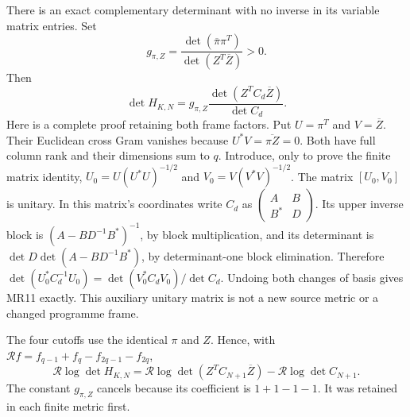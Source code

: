 \documentclass[11pt]{article}
\begin{document}
There is an exact complementary determinant with no inverse in its
variable matrix entries. Set
\[
 g_{\pi,Z}=
 \frac{\det(\overline\pi\pi^T)}{\det(Z^T\overline Z)}>0.
\]
Then
\[
 \boxed{\det H_{K,N}
     =g_{\pi,Z}\frac{\det(Z^TC_d\overline Z)}{\det C_d}.}
 \tag{MR11}
\]
Here is a complete proof retaining both frame factors. Put
$U=\pi^T$ and $V=\overline Z$. Their Euclidean cross Gram vanishes
because $U^*V=\overline{\pi Z}=0$. Both have full column rank and
their dimensions sum to $q$. Introduce, only to prove the finite
matrix identity, $U_0=U(U^*U)^{-1/2}$ and
$V_0=V(V^*V)^{-1/2}$. The matrix $[U_0,V_0]$ is unitary.
In this matrix's coordinates write $C_d$ as
$\left(\begin{smallmatrix}A&B\\B^*&D\end{smallmatrix}\right)$.
Its upper inverse block is $(A-BD^{-1}B^*)^{-1}$, by block
multiplication, and its determinant is
$\det D\det(A-BD^{-1}B^*)$, by determinant-one block elimination.
Therefore $\det(U_0^*C_d^{-1}U_0)=\det(V_0^*C_dV_0)/\det C_d$.
Undoing both changes of basis gives MR11 exactly. This auxiliary
unitary matrix is not a new source metric or a changed programme frame.

The four cutoffs use the identical $\pi$ and $Z$. Hence, with
$\mathcal R f=f_{q-1}+f_q-f_{2q-1}-f_{2q}$,
\[
 \mathcal R\log\det H_{K,N}
 =\mathcal R\log\det(Z^TC_{N+1}\overline Z)
  -\mathcal R\log\det C_{N+1}.\tag{MR12}
\]
The constant $g_{\pi,Z}$ cancels because its coefficient is $1+1-1-1$.
It was retained in each finite metric first.
\end{document}
